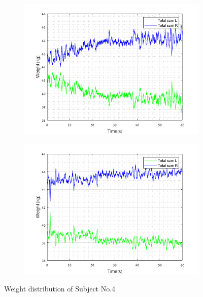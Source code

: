 \documentclass[twoside]{ctuthesis}
\theoremstyle{plain}
\theoremstyle{definition}
\theoremstyle{note}
\begin{document}
\begin{figure}[H]
	\centering
	\begin{subfigure}{\textwidth}
		\hspace*{-1cm}
		\includegraphics[scale=.9]{W_sub4_OE}
	\end{subfigure}\hfil
	\begin{subfigure}{\textwidth}
		\hspace*{-1cm}
		\includegraphics[scale=.9]{W_sub4_CE}
	\end{subfigure}
	\caption{Weight distribution of Subject No.4}
\end{figure}
\end{document}
